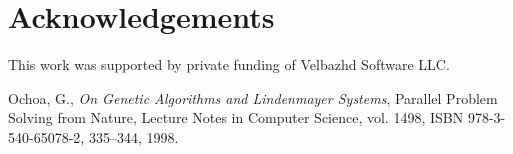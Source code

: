 \documentclass{llncs}
\begin{document}
\section*{Acknowledgements}
This work was supported by private funding of Velbazhd Software LLC.

\begin{thebibliography}{99}

 Ochoa, G., \textit{On Genetic Algorithms and Lindenmayer Systems}, Parallel Problem Solving from Nature, Lecture Notes in Computer Science, vol. 1498, ISBN 978-3-540-65078-2, 335--344, 1998.

\end{thebibliography}
\end{document}
